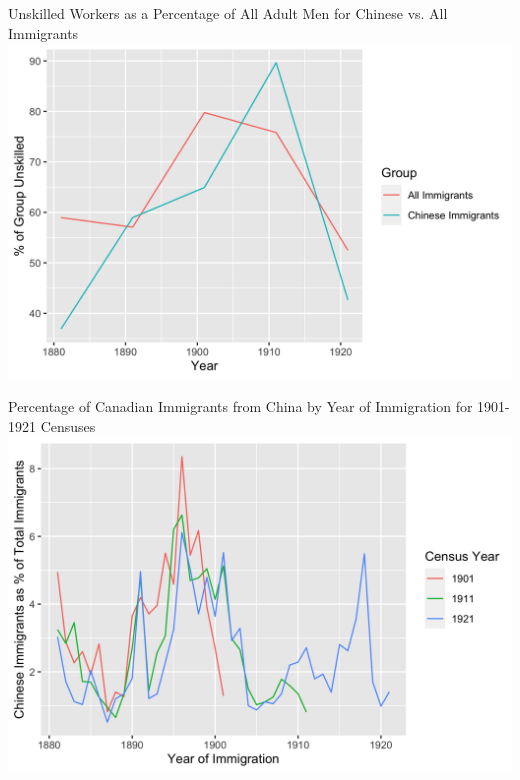 \documentclass[pdf]{beamer}
\begin{document}
\begin{frame}{Unskilled Workers as a Percentage of All Adult Men for Chinese vs. All Immigrants}
    \includegraphics[width = \textwidth]{../../figs/immigocs.png}
\end{frame}

\begin{frame}{Percentage of Canadian Immigrants from China by Year of Immigration for 1901-1921 Censuses}
    \includegraphics[width = \textwidth]{../../figs/yrimmpct.png}
\end{frame}
\end{document}
